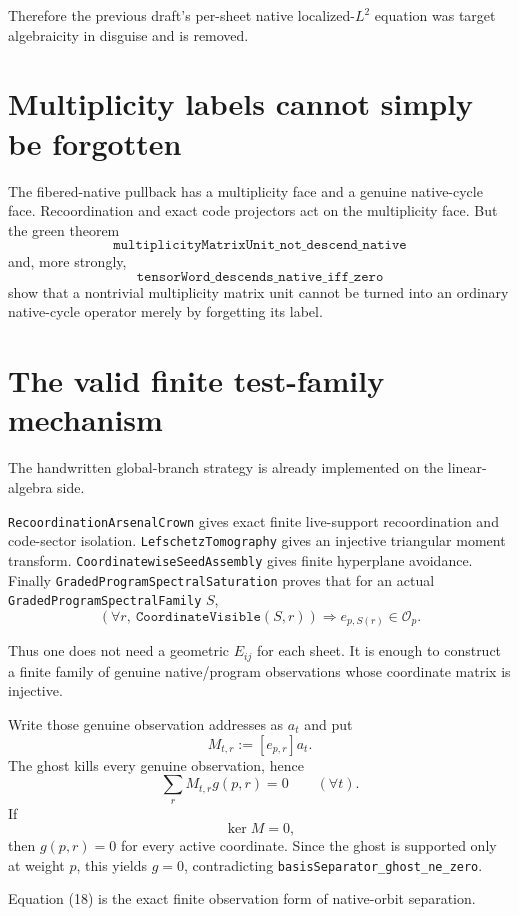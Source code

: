 \documentclass[11pt]{article}
\begin{document}
Therefore the previous draft's per-sheet native localized-$L^2$ equation was
target algebraicity in disguise and is removed.

\section{Multiplicity labels cannot simply be forgotten}

The fibered-native pullback has a multiplicity face and a genuine native-cycle
face. Recoordination and exact code projectors act on the multiplicity face.
But the green theorem
\[
 \texttt{multiplicityMatrixUnit\_not\_descend\_native} \tag{13}
\]
and, more strongly,
\[
 \texttt{tensorWord\_descends\_native\_iff\_zero} \tag{14}
\]
show that a nontrivial multiplicity matrix unit cannot be turned into an
ordinary native-cycle operator merely by forgetting its label.

\section{The valid finite test-family mechanism}

The handwritten global-branch strategy is already implemented on the
linear-algebra side.

\texttt{RecoordinationArsenalCrown} gives exact finite live-support
recoordination and code-sector isolation.
\texttt{LefschetzTomography} gives an injective triangular moment transform.
\texttt{CoordinatewiseSeedAssembly} gives finite hyperplane avoidance.
Finally \texttt{GradedProgramSpectralSaturation} proves that for an actual
\texttt{GradedProgramSpectralFamily} $S$,
\[
 (\forall r,\ \texttt{CoordinateVisible}(S,r))
 \Longrightarrow
 e_{p,S(r)}\in\mathcal O_p. \tag{15}
\]

Thus one does not need a geometric $E_{ij}$ for each sheet. It is enough to
construct a finite family of genuine native/program observations whose
coordinate matrix is injective.

Write those genuine observation addresses as $a_t$ and put
\[
 M_{t,r}:=[e_{p,r}]a_t. \tag{16}
\]
The ghost kills every genuine observation, hence
\[
 \sum_r M_{t,r}g(p,r)=0 \qquad(\forall t). \tag{17}
\]
If
\[
 \ker M=0, \tag{18}
\]
then $g(p,r)=0$ for every active coordinate. Since the ghost is supported only
at weight $p$, this yields $g=0$, contradicting
\texttt{basisSeparator\_ghost\_ne\_zero}.

Equation (18) is the exact finite observation form of native-orbit separation.
\end{document}
